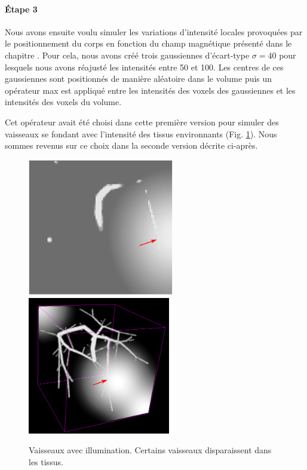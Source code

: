 \paragraph{Étape 3}
Nous avons ensuite voulu simuler les variations d'intensité locales provoquées par le positionnement du corps en fonction du champ magnétique présenté dans le chapitre \chapContextN{}. Pour cela, nous avons créé trois gaussiennes d'écart-type $\sigma=40$ pour lesquels nous avons réajusté les intensités entre 50 et 100. Les centres de ces gaussiennes sont positionnés de manière aléatoire dans le volume puis un opérateur max est appliqué entre les intensités des voxels des gaussiennes et les intensités des voxels du volume.

Cet opérateur avait été choisi dans cette première version pour simuler des vaisseaux se fondant avec l'intensité des tissus environnants (Fig. \ref{fig:VBI}). Nous sommes revenus sur ce choix dans la seconde version décrite ci-après.
\begin{figure}[!ht]
  \centering
  \includegraphics[height=6cm]{Images/2D_VBI.png}
  \includegraphics[height=6cm]{Images/3D_VBI.png}
  \caption{Vaisseaux avec illumination. Certains vaisseaux disparaissent dans les tissus.}
  \label{fig:VBI}
\end{figure}
